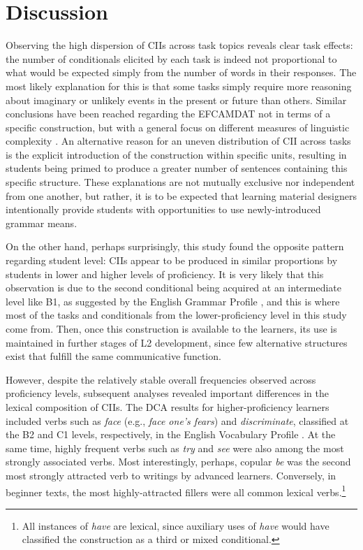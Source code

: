 \section{Discussion}

Observing the high dispersion of CIIs across task topics reveals clear task effects:
the number of conditionals elicited by each task is indeed not proportional to what would be expected simply from the number of words in their responses.
The most likely explanation for this is that some tasks simply require more reasoning about imaginary or unlikely events in the present or future than others. 
Similar conclusions have been reached regarding the EFCAMDAT not in terms of a specific construction, but with a general focus on different measures of linguistic complexity \citep{alexopoulouTaskEffect2017}.
An alternative reason for an uneven distribution of CII across tasks is the explicit introduction of the construction within specific units, resulting in students being primed to produce a greater number of sentences containing this specific structure.
These explanations are not mutually exclusive nor independent from one another, but rather, it is to be expected that learning material designers intentionally provide students with opportunities to use newly-introduced grammar means.

On the other hand, perhaps surprisingly, this study found the opposite pattern regarding student level: CIIs appear to be produced in similar proportions by students in lower and higher levels of proficiency.
It is very likely that this observation is due to the second conditional being acquired at an intermediate level like B1, as suggested by the English Grammar Profile \citep{o2017english},
and this is where most of the tasks and conditionals from the lower-proficiency level in this study come from.
Then, once this construction is available to the learners, its use is maintained in further stages of L2 development, since few alternative structures exist that fulfill the same communicative function. 

However, despite the relatively stable overall frequencies observed across proficiency levels, subsequent analyses revealed important differences in the lexical composition of CIIs.
The DCA results for higher-proficiency learners included verbs such as \textit{face} (e.g., \textit{face one's fears}) and \textit{discriminate}, classified at the B2 and C1 levels, respectively, in the English Vocabulary Profile \citep{capel2010a1, capel2012completing}.
At the same time, highly frequent verbs such as \textit{try} and \textit{see} were also among the most strongly associated verbs. 
Most interestingly, perhaps,  copular \textit{be} was the second most strongly attracted verb to writings by advanced learners. 
Conversely, in beginner texts, the most highly-attracted fillers were all common lexical verbs.\footnote{All instances of \textit{have} are lexical, since auxiliary uses of \textit{have} would have classified the construction as a third or mixed conditional.}

